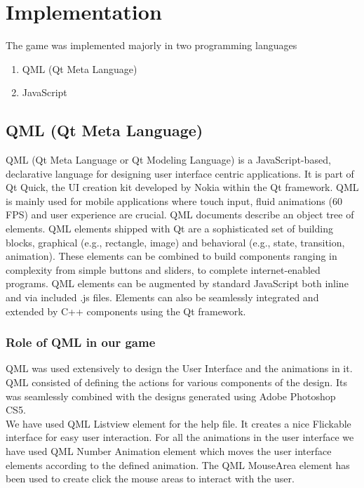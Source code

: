 \documentclass[a4paper,12pt]{article}
\begin{document}
\section{Implementation}
\hspace{18pt}The game was implemented majorly in two programming languages
\begin{enumerate}
 \item QML (Qt Meta Language)
 \item JavaScript
\end{enumerate}

\subsection{QML (Qt Meta Language)}
\hspace{18pt}QML (Qt Meta Language or Qt Modeling Language) is a JavaScript-based, declarative language for designing user interface centric applications. It is part of Qt Quick, the UI creation kit developed by Nokia within the Qt framework. QML is mainly used for mobile applications where touch input, fluid animations (60 FPS) and user experience are crucial. QML documents describe an object tree of elements. QML elements shipped with Qt are a sophisticated set of building blocks, graphical (e.g., rectangle, image) and behavioral (e.g., state, transition, animation). These elements can be combined to build components ranging in complexity from simple buttons and sliders, to complete internet-enabled programs. QML elements can be augmented by standard JavaScript both inline and via included .js files. Elements can also be seamlessly integrated and extended by C++ components using the Qt framework.

\subsubsection{Role of QML in our game}
\hspace{18pt}QML was used extensively to design the User Interface and the animations in it. QML consisted of defining the actions for various components of the design. Its was seamlessly combined with the designs generated using Adobe Photoshop CS5.\\

We have used QML Listview element for the help file. It creates a nice Flickable interface for easy user interaction. For all the animations in the user interface we have used QML Number Animation element which moves the user interface elements according to the defined animation. The QML MouseArea element has been used to create click the mouse areas to interact with the user.
\end{document}
